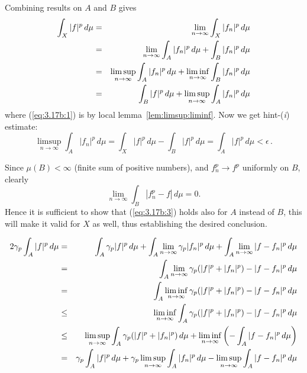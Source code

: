 \begin{enumerate}
\begin{itemize}
 Combining results on $A$ and $B$ gives
 \begin{eqnarray}
      \int_X |f|^p\,d\mu
  &=& \lim_{n\to\infty} \int_X |f_n|^p\,d\mu \notag \\
  &=& \lim_{n\to\infty} \int_A |f_n|^p\,d\mu + \int_B |f_n|^p\,d\mu \notag \\
  &=& \limsup_{n\to\infty} \int_A |f_n|^p\,d\mu +
      \liminf_{n\to\infty} \int_B |f_n|^p\,d\mu  \label{eq:3.17b:1} \\
  &=& \int_B |f|^p\,d\mu + \limsup_{n\to\infty} \int_A |f_n|^p\,d\mu \notag
 \end{eqnarray}
 where (\ref{eq:3.17b:1}) is by local lemma~\ref{lem:limsup:liminf}.
 Now we get hint-(\emph{i}) estimate:
 \begin{equation*}
  \limsup_{n\to\infty} \int_A |f_n|^p\,d\mu
  = \int_X |f|^p\,d\mu - \int_B |f|^p\,d\mu
  = \int_A |f|^p\,d\mu < \epsilon\,.
 \end{equation*}

 Since \(\mu(B) < \infty\) (finite sum of positive numbers),
 and \(f_n^p\to f^p\) uniformly on $B$, clearly
 \begin{equation} \label{eq:3.17b:3}
  \lim_{n\to\infty} \int_B |f_n^p - f|\,d\mu = 0.
 \end{equation}
 Hence it is sufficient to show that (\ref{eq:3.17b:3}) holds
 also for $A$ instead of $B$, this will make it valid for $X$ as well,
 thus establishing the desired conclusion.

 \begin{eqnarray}
  2\gamma_p \int_A |f|^p\,d\mu
  &=& \notag
   \int_A \gamma_p |f|^p\,d\mu
   +
   \int_A \lim_{n\to\infty} \gamma_p |f_n|^p\,d\mu
   +
   \int_A \lim_{n\to\infty} |f - f_n|^p\,d\mu \\
  &=& \notag
   \int_A \lim_{n\to\infty} \gamma_p(|f|^p + |f_n|^p) - |f - f_n|^p\,d\mu \\
  &=& \notag
   \int_A \liminf_{n\to\infty} \gamma_p(|f|^p + |f_n|^p) - |f - f_n|^p\,d\mu \\
  &\leq& \label{eq:3.17b:fatou}
   \liminf_{n\to\infty} \int_A \gamma_p(|f|^p + |f_n|^p) - |f - f_n|^p\,d\mu \\
  &\leq& \notag
   \limsup_{n\to\infty} \int_A \gamma_p(|f|^p + |f_n|^p)\,d\mu
   +\liminf_{n\to\infty} \left(-\int_A |f - f_n|^p\,d\mu\right) \\
  &=& \notag
   \gamma_p \int_A |f|^p\,d\mu
   + \gamma_p \limsup_{n\to\infty} \int_A |f_n|^p\,d\mu
   - \limsup_{n\to\infty} \int_A |f - f_n|^p\,d\mu \\
 \end{eqnarray}


\end{itemize}
\end{enumerate}
